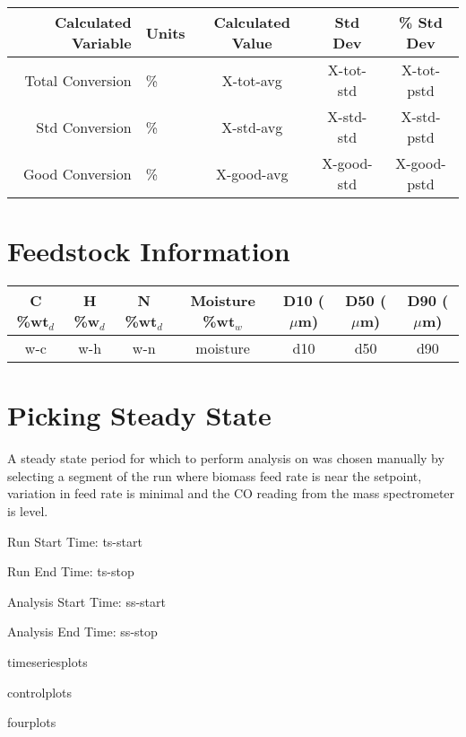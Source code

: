 \documentclass[11pt]{article}
\begin{document}
\begin{table}[hb]
\centering
\begin{tabular}{r l c c c}
	Calculated Variable	& Units		& Calculated Value		& Std Dev		& \% Std Dev	\\
\hline 	Total Conversion	& \%			& X-tot-avg			& X-tot-std		& X-tot-pstd		\\
	Std Conversion	& \%			& X-std-avg			& X-std-std		& X-std-pstd		\\
	Good Conversion	& \%			& X-good-avg		& X-good-std		& X-good-pstd	\\
\end{tabular}
\end{table}

\newpage

\vspace{-4ex}
\section*{Feedstock Information}
\vspace{-2ex}

\begin{table}[h]
\centering
\begin{tabular}{c c c c c c c}
	C \%wt$_{d}$	& H \%w$_{d}$	& N \%wt$_{d}$	& Moisture \%wt$_{w}$	& D10 ($\mu$m)	& D50 ($\mu$m)	& D90 ($\mu$m)	\\
\hline 	w-c			& w-h			& w-n			& moisture			& d10			& d50			& d90		\\
\end{tabular}
\end{table}


\section*{Picking Steady State}

A steady state period for which to perform analysis on was chosen manually by selecting a segment of the run where biomass feed rate is near the setpoint, variation in feed rate is minimal and the CO reading from the mass spectrometer is level.

Run Start Time: ts-start

Run End Time: ts-stop

Analysis Start Time: ss-start

Analysis End Time: ss-stop

\centering

timeseriesplots

\newpage

controlplots

\newpage

fourplots
\end{document}
